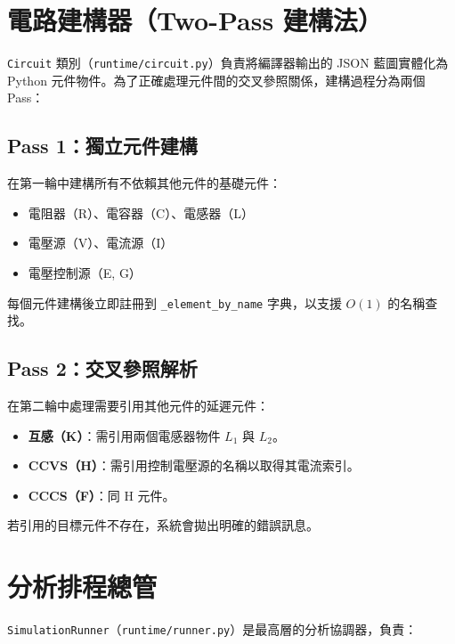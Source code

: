 \documentclass[12pt,a4paper]{article}
\begin{document}
\section{電路建構器（Two-Pass 建構法）}

\texttt{Circuit} 類別（\texttt{runtime/circuit.py}）負責將編譯器輸出的 JSON 藍圖實體化為 Python 元件物件。為了正確處理元件間的交叉參照關係，建構過程分為兩個 Pass：

\subsection{Pass 1：獨立元件建構}

在第一輪中建構所有不依賴其他元件的基礎元件：
\begin{itemize}
  \item 電阻器（R）、電容器（C）、電感器（L）
  \item 電壓源（V）、電流源（I）
  \item 電壓控制源（E, G）
\end{itemize}

每個元件建構後立即註冊到 \texttt{\_element\_by\_name} 字典，以支援 $O(1)$ 的名稱查找。

\subsection{Pass 2：交叉參照解析}

在第二輪中處理需要引用其他元件的延遲元件：
\begin{itemize}
  \item \textbf{互感（K）}：需引用兩個電感器物件 $L_1$ 與 $L_2$。
  \item \textbf{CCVS（H）}：需引用控制電壓源的名稱以取得其電流索引。
  \item \textbf{CCCS（F）}：同 H 元件。
\end{itemize}

若引用的目標元件不存在，系統會拋出明確的錯誤訊息。


\section{分析排程總管}

\texttt{SimulationRunner}（\texttt{runtime/runner.py}）是最高層的分析協調器，負責：
\end{document}
